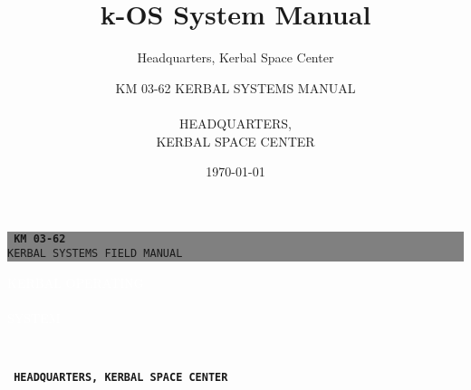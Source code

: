 \documentclass[letterpaper, twoside, 10pt]{report}
\title{k-OS System Manual}
\author{Headquarters, Kerbal Space Center}
\date{\today}
\author{%
    KM 03-62
    KERBAL SYSTEMS MANUAL \\
    \vspace{40pt} \\
    HEADQUARTERS,\\
    KERBAL SPACE CENTER\\
    }
\begin{document}
\begin{titlepage}
\BgThispage
{}
\begin{center}
		\colorbox{gray}{\begin{minipage}{7in}
		\begin{flushright}
		\texttt{\LARGE{\textbf{ KM\,03-62}}}\\
		\texttt{\large KERBAL SYSTEMS FIELD MANUAL}
		\end{flushright}
		\end{minipage}}
	\end{center}
\noindent
\textcolor{white}{\bigsf KERBAL OPERATING\\
				\vspace{8pt} \\
				 SYSTEM}
\vspace*{2.5cm}\par
\noindent
\vspace{300pt} \\
\begin{center}
\texttt{\LARGE{\textbf{ HEADQUARTERS, KERBAL SPACE CENTER}}}
\end{center}
\end{titlepage}
\restoregeometry
\thispagestyle{empty}
\newpage
{}
\setcounter{page}{1}



\tableofcontents
\newpage
{}
\setcounter{page}{1}










\end{document}
